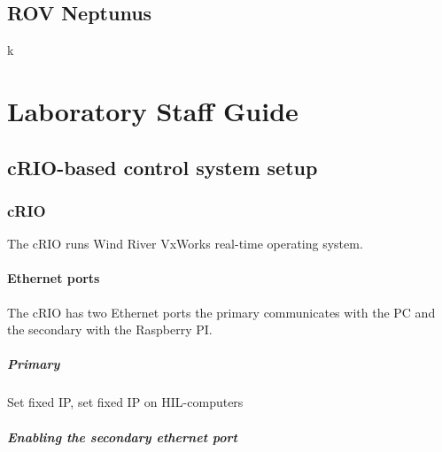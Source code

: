 \documentclass[a4paper,twoside,english]{report}
\begin{document}
\clearpage{}

\chapter{ROV Neptunus}

k

\clearpage{}

\newpage{}

\part{Laboratory Staff Guide}\label{part: Equipment setup and configuration}

\chapter{cRIO-based control system setup}

\section{\label{subsec: cRIO setup}cRIO}

The cRIO runs Wind River VxWorks real-time operating system.

\subsection{Ethernet ports}

The cRIO has two Ethernet ports the primary communicates with the
PC and the secondary with the Raspberry PI.

\subsubsection{Primary}

Set fixed IP, set fixed IP on HIL-computers

\subsubsection{Enabling the secondary ethernet port}
\end{document}

